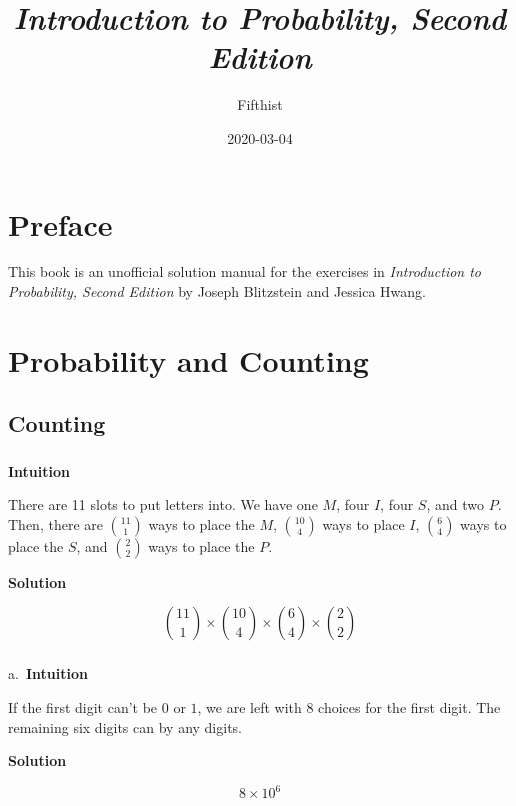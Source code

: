 \documentclass[]{book}
\title{\emph{Introduction to Probability, Second Edition}}
\author{Fifthist}
\date{2020-03-04}
\begin{document}
\maketitle

{
\setcounter{tocdepth}{1}
\tableofcontents
}
\chapter*{Preface}\label{preface}

This book is an unofficial solution manual for the exercises in
\emph{Introduction to Probability, Second Edition} by Joseph Blitzstein
and Jessica Hwang.

\chapter{Probability and Counting}\label{probability-and-counting}

\section{Counting}\label{counting}

\subsection{}\label{section}

\textbf{Intuition}

There are 11 slots to put letters into. We have one \(M\), four \(I\),
four \(S\), and two \(P\). Then, there are \({11 \choose 1}\) ways to
place the \(M\), \({10 \choose 4}\) ways to place \(I\),
\({6 \choose 4}\) ways to place the \(S\), and \({2 \choose 2}\) ways to
place the \(P\).

 \textbf{Solution}

\[ {11 \choose 1} \times {10 \choose 4} \times {6 \choose 4} \times {2 \choose 2} \]

\subsection{}\label{section-1}

a.~\textbf{Intuition}

If the first digit can't be \(0\) or \(1\), we are left with \(8\)
choices for the first digit. The remaining six digits can by any digits.

 \textbf{Solution}

\[ 8 \times 10^{6} \]
\end{document}
